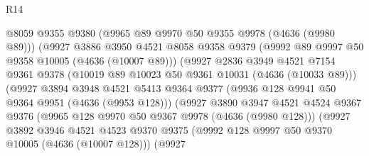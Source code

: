 \begin{lexlean}{R14}
\begin{coremodule}
                                  @8059
                                  @9355
                                  @9380
                                  (@9965 @89 @9970 @50 @9355 @9978 (@4636 (@9980 @89)))
                                  (@9927
                                    @3886
                                    @3950
                                    @4521
                                    @8058
                                    @9358
                                    @9379
                                    (@9992 @89 @9997 @50 @9358 @10005 (@4636 (@10007 @89)))
                                    (@9927
                                      @2836
                                      @3949
                                      @4521
                                      @7154
                                      @9361
                                      @9378
                                      (@10019 @89 @10023 @50 @9361 @10031 (@4636 (@10033 @89)))
                                      (@9927
                                        @3894
                                        @3948
                                        @4521
                                        @5413
                                        @9364
                                        @9377
                                        (@9936 @128 @9941 @50 @9364 @9951 (@4636 (@9953 @128)))
                                        (@9927
                                          @3890
                                          @3947
                                          @4521
                                          @4524
                                          @9367
                                          @9376
                                          (@9965 @128 @9970 @50 @9367 @9978 (@4636 (@9980 @128)))
                                          (@9927
                                            @3892
                                            @3946
                                            @4521
                                            @4523
                                            @9370
                                            @9375
                                            (@9992
                                              @128
                                              @9997
                                              @50
                                              @9370
                                              @10005
                                              (@4636 (@10007 @128)))
                                            (@9927

\end{coremodule}
\end{lexlean}
